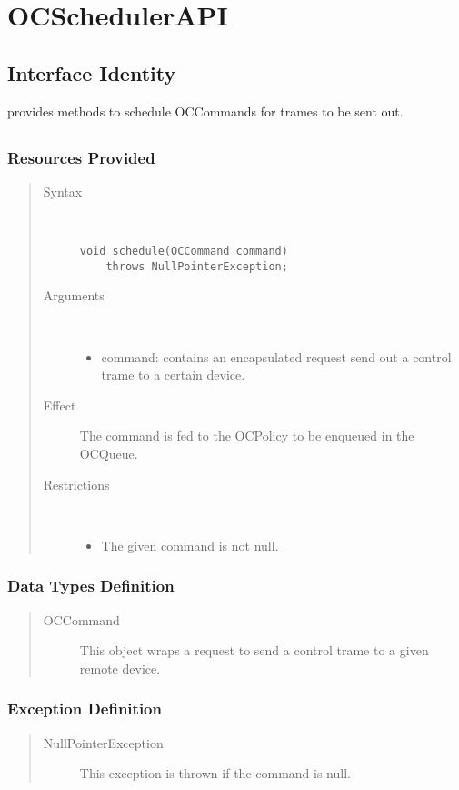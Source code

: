 \section{OCSchedulerAPI}

\subsection{Interface Identity}

\npar {} provides methods to schedule
OCCommands for trames to be sent out.

\subsection{}

\subsubsection{Resources Provided}

\begin{quote}
	\begin{description}
		\item[Syntax] \ 
		\begin{verbatim}
void schedule(OCCommand command)
    throws NullPointerException;
		\end{verbatim}
		\item[Arguments] \
		\begin{itemize}
			\item command: contains an encapsulated request send out a control trame to
			a certain device.
		\end{itemize}
		\item[Effect] The command is fed to the OCPolicy to be enqueued in the
		OCQueue.
		\item[Restrictions] \ 
		\begin{itemize}
			\item The given command is not null.
		\end{itemize}
	\end{description} 
\end{quote}

\subsubsection{Data Types Definition}

\begin{quote}
	\begin{description}
		\item[OCCommand] This object wraps a request to send a control
		trame to a given remote device.
	\end{description}
\end{quote}

\subsubsection{Exception Definition}

\begin{quote}
	\begin{description}
		\item[NullPointerException] This exception is thrown if the command is null.
	\end{description} 
\end{quote}